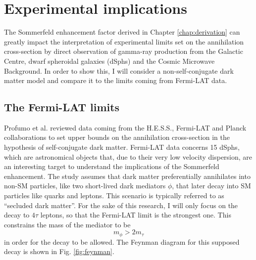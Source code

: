 \chapter{Experimental implications}

The Sommerfeld enhancement factor derived in Chapter \ref{chap:derivation} can greatly impact the interpretation of experimental limits set on the annihilation cross-section by direct observation of gamma-ray production from the Galactic Centre, dwarf spheroidal galaxies (dSphs) and the Cosmic Microwave Background. In order to show this, I will consider a non-self-conjugate dark matter model and compare it to the limits coming from Fermi-LAT data.

\section{The Fermi-LAT limits}

Profumo et al. \cite{Profumo_2018} reviewed data coming from the H.E.S.S., Fermi-LAT and Planck collaborations to set upper bounds on the annihilation cross-section in the hypothesis of self-conjugate dark matter. Fermi-LAT data concerns 15 dSphs, which are astronomical objects that, due to their very low velocity dispersion, are an interesting target to understand the implications of the Sommerfeld enhancement. The study assumes that dark matter preferentially annihilates into non-SM particles, like two short-lived dark mediators \(\phi \), that later decay into SM particles like quarks and leptons. This scenario is typically referred to as ``secluded dark matter''. For the sake of this research, I will only focus on the decay to \(4\tau \) leptons, so that the Fermi-LAT limit is the strongest one. This constrains the mass of the mediator to be
\begin{equation}\label{eq:mediator_mass}
	m_{\phi }  > 2 m_{\tau } 
\end{equation}
in order for the decay to be allowed. The Feynman diagram for this supposed decay is shown in Fig. \ref{fig:feynman}.


